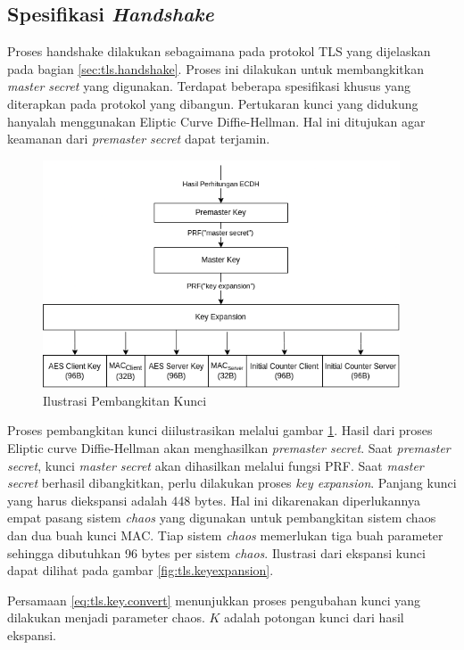 \subsection{Spesifikasi \emph{Handshake}}
Proses handshake dilakukan sebagaimana pada protokol TLS yang dijelaskan pada bagian \ref{sec:tls.handshake}. Proses ini dilakukan untuk membangkitkan \emph{master secret} yang digunakan. Terdapat beberapa spesifikasi khusus yang diterapkan pada protokol yang dibangun. Pertukaran kunci yang didukung hanyalah menggunakan Eliptic Curve Diffie-Hellman. Hal ini ditujukan agar keamanan dari \emph{premaster secret} dapat terjamin.

\begin{figure}[!h]
  \centering
  \includegraphics[width=400px]{chapters/res/chapter-3/img/keygen.png}
  \caption{Ilustrasi Pembangkitan Kunci} \label{fig:tls.keygen}
\end{figure}


Proses pembangkitan kunci diilustrasikan melalui gambar \ref{fig:tls.keygen}. Hasil dari proses Eliptic curve Diffie-Hellman akan menghasilkan \emph{premaster secret}. Saat \emph{premaster secret}, kunci \emph{master secret} akan dihasilkan melalui fungsi PRF. Saat \emph{master secret} berhasil dibangkitkan, perlu dilakukan proses \emph{key expansion}. Panjang kunci yang harus diekspansi adalah 448 bytes. Hal ini dikarenakan diperlukannya empat pasang sistem \emph{chaos} yang digunakan untuk pembangkitan sistem chaos dan dua buah kunci MAC. Tiap sistem \emph{chaos} memerlukan tiga buah parameter sehingga dibutuhkan 96 bytes per sistem \emph{chaos}. Ilustrasi dari ekspansi kunci dapat dilihat pada gambar \ref{fig:tls.keyexpansion}.

Persamaan \ref{eq:tls.key.convert} menunjukkan proses pengubahan kunci yang dilakukan menjadi parameter chaos. $K$ adalah potongan kunci dari hasil ekspansi.

